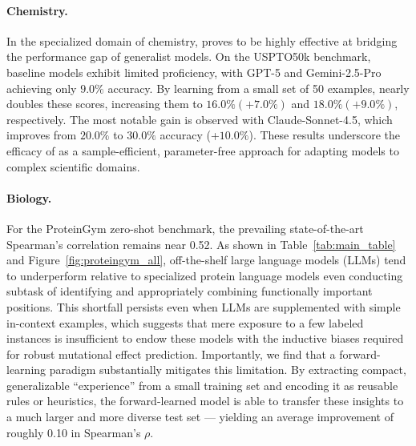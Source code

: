 \paragraph{Chemistry.} In the specialized domain of chemistry, \method{} proves to be highly effective at bridging the performance gap of generalist models. On the USPTO50k benchmark, baseline models exhibit limited proficiency, with GPT-5 and Gemini-2.5-Pro achieving only $9.0\%$ accuracy. By learning from a small set of 50 examples, \method{} nearly doubles these scores, increasing them to $16.0\% (+7.0\%)$ and $18.0\% (+9.0\%)$, respectively. The most notable gain is observed with Claude-Sonnet-4.5, which improves from $20.0\%$ to $30.0\%$ accuracy (+$10.0\%$). These results underscore the efficacy of \method{} as a sample-efficient, parameter-free approach for adapting models to complex scientific domains.


\paragraph{Biology.} For the ProteinGym zero-shot benchmark, the prevailing state-of-the-art Spearman’s correlation remains near 0.52. As shown in Table~\ref{tab:main_table} and Figure~\ref{fig:proteingym_all}, off-the-shelf large language models (LLMs) tend to underperform relative to specialized protein language models even conducting subtask of identifying and appropriately combining functionally important positions. This shortfall persists even when LLMs are supplemented with simple in-context examples, which suggests that mere exposure to a few labeled instances is insufficient to endow these models with the inductive biases required for robust mutational effect prediction. Importantly, we find that a forward-learning paradigm substantially mitigates this limitation. By extracting compact, generalizable “experience” from a small training set and encoding it as reusable rules or heuristics, the forward-learned model is able to transfer these insights to a much larger and more diverse test set — yielding an average improvement of roughly 0.10 in Spearman’s $\rho$. 







